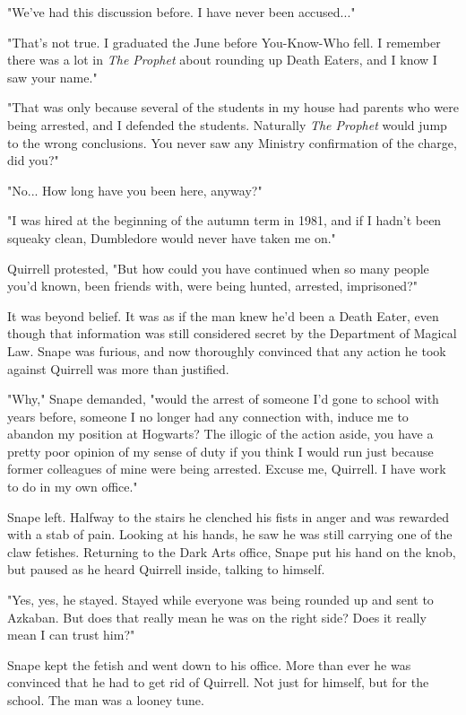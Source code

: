 \documentclass[a4paper,11pt]{article}
\begin{document}
"We've had this discussion before. I have never been accused..."

"That's not true. I graduated the June before You-Know-Who fell. I remember there was a lot in \emph{The Prophet} about rounding up Death Eaters, and I know I saw your name."

"That was only because several of the students in my house had parents who were being arrested, and I defended the students. Naturally \emph{The Prophet} would jump to the wrong conclusions. You never saw any Ministry confirmation of the charge, did you?"

"No... How long have you been here, anyway?"

"I was hired at the beginning of the autumn term in 1981, and if I hadn't been squeaky clean, Dumbledore would never have taken me on."

Quirrell protested, "But how could you have continued when so many people you'd known, been friends with, were being hunted, arrested, imprisoned?"

It was beyond belief. It was as if the man knew he'd been a Death Eater, even though that information was still considered secret by the Department of Magical Law. Snape was furious, and now thoroughly convinced that any action he took against Quirrell was more than justified.

"Why," Snape demanded, "would the arrest of someone I'd gone to school with years before, someone I no longer had any connection with, induce me to abandon my position at Hogwarts? The illogic of the action aside, you have a pretty poor opinion of my sense of duty if you think I would run just because former colleagues of mine were being arrested. Excuse me, Quirrell. I have work to do in my own office."

Snape left. Halfway to the stairs he clenched his fists in anger and was rewarded with a stab of pain. Looking at his hands, he saw he was still carrying one of the claw fetishes. Returning to the Dark Arts office, Snape put his hand on the knob, but paused as he heard Quirrell inside, talking to himself.

"Yes, yes, he stayed. Stayed while everyone was being rounded up and sent to Azkaban. But does that really mean he was on the right side? Does it really mean I can trust him?"

Snape kept the fetish and went down to his office. More than ever he was convinced that he had to get rid of Quirrell. Not just for himself, but for the school. The man was a looney tune.
\end{document}

